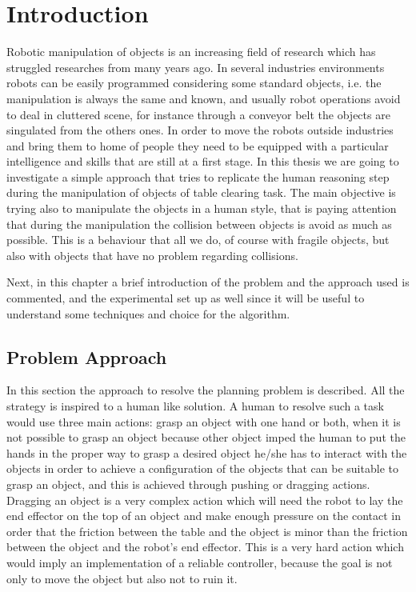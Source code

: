 \chapter{Introduction}
\label{ch:introduction}

Robotic manipulation of objects is an increasing field of research which has struggled researches from many years ago. In several industries environments robots can be easily programmed considering some standard objects, i.e. the manipulation is always the same and known, and usually robot operations avoid to deal in cluttered scene, for instance through a conveyor belt the objects are singulated from the others ones. In order to move the robots outside industries and bring them to home of people they need to be equipped with a particular intelligence and skills that are still at a first stage.
In this thesis we are going to investigate a simple approach that tries to replicate the human reasoning step during the manipulation of objects of table clearing task. The main objective is trying also to manipulate the objects in a human style, that is paying attention that during the manipulation the collision between objects is avoid as much as possible. This is a behaviour that all we do, of course with fragile objects, but also with objects that have no problem regarding collisions.  

Next, in this chapter a brief introduction of the problem and the approach used is commented, and the experimental set up as well since it will be useful to understand some techniques and choice for the algorithm. 

\section{Problem Approach}
In this section the approach to resolve the planning problem is described. All the strategy is inspired to a human like solution. A human to resolve such a task would use three main actions: grasp an object with one hand or both, when it is not possible to grasp an object because other object imped the human to put the hands in the proper way to grasp a desired object he/she has to interact with the objects in order to achieve a configuration of the objects that can be suitable to grasp an object, and this is achieved through pushing or dragging actions. Dragging an object is a very complex action which will need the robot to lay the end effector on the top of an object and make enough pressure on the contact in order that the friction between the table and the object is minor than the friction between the object and the robot's end effector. This is a very hard action which would imply an implementation of a reliable controller, because the goal is not only to move the object but also not to ruin it.  

